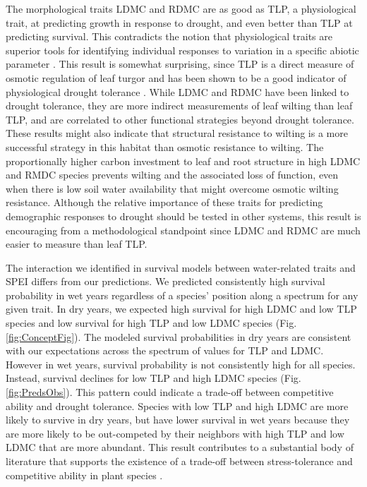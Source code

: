 \documentclass[12pt, letterpaper]{article}
\begin{document}
  The morphological traits LDMC and RDMC are as good as TLP, a physiological trait, at predicting growth in response to drought, and even better than TLP at predicting survival. This contradicts the notion that physiological traits are superior tools for identifying individual responses to variation in a specific abiotic parameter \citep{Volaire2018}. This result is somewhat surprising, since TLP is a direct measure of osmotic regulation of leaf turgor and has been shown to be a good indicator of physiological drought tolerance \citep{Bartlett2012}. While LDMC and RDMC have been linked to drought tolerance, they are more indirect measurements of leaf wilting than leaf TLP, and are correlated to other functional strategies beyond drought tolerance. These results might also indicate that structural resistance to wilting is a more successful strategy in this habitat than osmotic resistance to wilting. The proportionally higher carbon investment to leaf and root structure in high LDMC and RMDC species prevents wilting and the associated loss of function, even when there is low soil water availability that might overcome osmotic wilting resistance. Although the relative importance of these traits for predicting demographic responses to drought should be tested in other systems, this result is encouraging from a methodological standpoint since LDMC and RDMC are much easier to measure than leaf TLP. 

 The interaction we identified in survival models between water-related traits and SPEI differs from our predictions. We predicted consistently high survival probability in wet years regardless of a species' position along a spectrum for any given trait. In dry years, we expected high survival for high LDMC and low TLP species and low survival for high TLP and low LDMC species (Fig.\ref{fig:ConceptFig}). The modeled survival probabilities in dry years are consistent with our expectations across the spectrum of values for TLP and LDMC. However in wet years, survival probability is not consistently high for all species. Instead, survival declines for low TLP and high LDMC species (Fig.\ref{fig:PredsObs}). This pattern could indicate a trade-off between competitive ability and drought tolerance. Species with low TLP and high LDMC are more likely to survive in dry years, but have lower survival in wet years because they are more likely to be out-competed by their neighbors with high TLP and low LDMC that are more abundant. This result contributes to a substantial body of literature that supports the existence of a trade-off between stress-tolerance and competitive ability in plant species \citep{Grime1979, Grime1997, Craine2007, Volaire2018}. 
\end{document}
